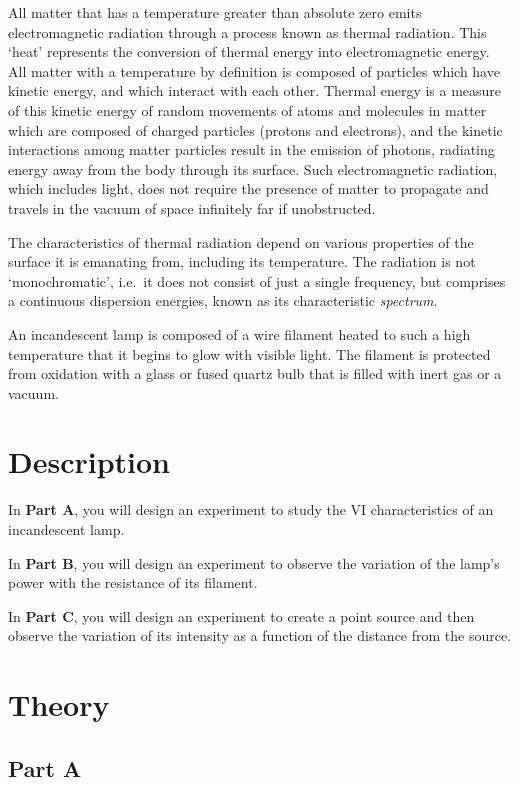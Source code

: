 All matter that has a temperature greater than absolute zero emits electromagnetic radiation through a process known as thermal radiation. This `heat' represents the conversion of thermal energy into electromagnetic energy. All matter with a temperature by definition is composed of particles which have kinetic energy, and which interact with each other. Thermal energy is a measure of this kinetic energy of random movements of atoms and molecules in matter which are composed of charged particles (protons and electrons), and the kinetic interactions among matter particles result in the emission of photons, radiating energy away from the body through its surface. Such electromagnetic radiation, which includes light, does not require the presence of matter to propagate and travels in the vacuum of space infinitely far if unobstructed.

The characteristics of thermal radiation depend on various properties of the surface it is emanating from, including its temperature. The radiation is not `monochromatic', i.e.\, it does not consist of just a single frequency, but comprises a continuous dispersion energies, known as its characteristic \textit{spectrum}.


An incandescent lamp is composed of a wire filament heated to such a high temperature that it begins to glow with visible light. The filament is protected from oxidation with a glass or fused quartz bulb that is filled with inert gas or a vacuum.



\section*{Description}

In \textbf{Part A}, you will design an experiment to study the VI characteristics of an incandescent lamp. 

In \textbf{Part B}, you will design an experiment to observe the variation of the lamp's power with the resistance of its filament. 

In \textbf{Part C}, you will design an experiment to create a point source and then observe the variation of its intensity as a function of the distance from the source. 


\section*{Theory}

\subsection*{Part A}

